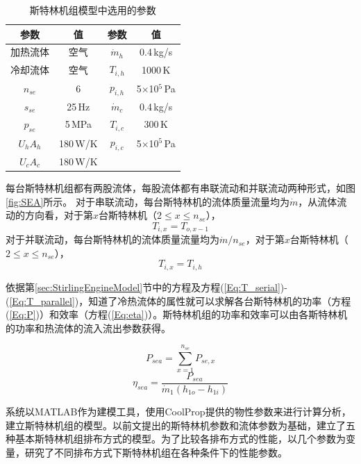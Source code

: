 \begin{table}[htbp]
	\caption{斯特林机组模型中选用的参数}
	\begin{center}
	\begin{tabular}{cccc}
		\toprule
		参数		&	值	& 参数	&	值\\
		\midrule
		加热流体	&	空气		&	$\dot{m}_h$	&	0.4\,kg/s\\
		冷却流体	&	空气	&	$T_{i,h}$	&	1000\,K\\
		$n_{se}$	&	6	&	$p_{i,h}$	&	5$\times$10$^5$\,Pa\\
		$s_{se}$	&	25\,Hz	&	$\dot{m}_c$	&	0.4\,kg/s\\
		$p_{se}$		&	5\,MPa	&	$T_{i,c}$	&	300\,K\\
		$U_hA_h$	&	180\,W/K	&	$p_{i,c}$	&	5$\times$10$^5$\,Pa\\
		$U_cA_c$		&	180\,W/K	&&\\
		\bottomrule
	\end{tabular}
	\end{center}
	\label{tab:parameters}
\end{table}

每台斯特林机组都有两股流体，每股流体都有串联流动和并联流动两种形式，如图\ref{fig:SEA}所示。
对于串联流动，每台斯特林机的流体质量流量均为$\dot{m}$，从流体流动的方向看，对于第$x$台斯特林机（$2\leqslant{}x\leqslant{}n_{se}$），
\begin{equation}
	T_{i,x} = T_{o,x-1}
	\label{Eq:T_serial}
\end{equation}
对于并联流动，每台斯特林机的流体质量流量均为$\dot{m}/n_{se}$，对于第$x$台斯特林机（$2\leqslant{}x\leqslant{}n_{se}$），
\begin{equation}
	T_{i,x} = T_{i,h}
	\label{Eq:T_parallel}
\end{equation}

依据第\ref{sec:StirlingEngineModel}节中的方程及方程(\ref{Eq:T_serial})-(\ref{Eq:T_parallel})，知道了冷热流体的属性就可以求解各台斯特林机的功率（方程(\ref{Eq:P})）和效率（方程(\ref{Eq:eta})）。斯特林机组的功率和效率可以由各斯特林机的功率和热流体的流入流出参数获得。

\begin{equation}
	P_{sea} = \sum_{x = 1}^{n_{se}}P_{se,x}
\end{equation}
\begin{equation}
	\eta_{sea} = \dfrac{P_{sea}}{\dot{m}_1(h_{1o} - h_{1i})}
\end{equation}

系统以MATLAB作为建模工具，使用CoolProp提供的物性参数来进行计算分析，建立斯特林机组的模型。以前文提出的斯特林机参数和流体参数为基础，建立了五种基本斯特林机组排布方式的模型。为了比较各排布方式的性能，以几个参数为变量，研究了不同排布方式下斯特林机组在各种条件下的性能参数。


